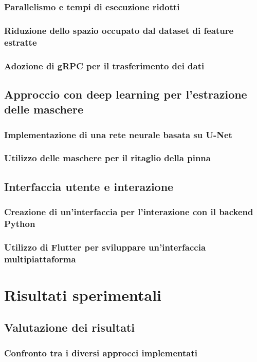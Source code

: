 \documentclass[a4paper,12pt]{report}
\begin{document}
\subsection{Parallelismo e tempi di esecuzione ridotti}
\subsection{Riduzione dello spazio occupato dal dataset di feature estratte}
\subsection{Adozione di gRPC per il trasferimento dei dati}
\section{Approccio con deep learning per l'estrazione delle maschere}
\subsection{Implementazione di una rete neurale basata su U-Net}
\subsection{Utilizzo delle maschere per il ritaglio della pinna}
\section{Interfaccia utente e interazione}
\subsection{Creazione di un'interfaccia per l'interazione con il backend Python}
\subsection{Utilizzo di Flutter per sviluppare un'interfaccia multipiattaforma}

\chapter{Risultati sperimentali}
\section{Valutazione dei risultati}
\subsection{Confronto tra i diversi approcci implementati}
\end{document}
